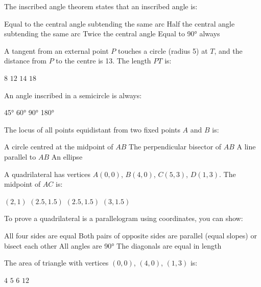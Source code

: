 \documentclass[addpoints]{exam}
\begin{document}
\begin{questions}
\question[1] The inscribed angle theorem states that an inscribed angle is:
\begin{choices}
    \choice Equal to the central angle subtending the same arc
    \correctchoice Half the central angle subtending the same arc
    \choice Twice the central angle
    \choice Equal to \ang{90} always
\end{choices}

\question[1] A tangent from an external point $P$ touches a circle (radius 5) at $T$,
and the distance from $P$ to the centre is 13. The length $PT$ is:
\begin{choices}
    \choice $8$
    \correctchoice $12$
    \choice $14$
    \choice $18$
\end{choices}

\question[1] An angle inscribed in a semicircle is always:
\begin{choices}
    \choice \ang{45}
    \choice \ang{60}
    \correctchoice \ang{90}
    \choice \ang{180}
\end{choices}

\question[1] The locus of all points equidistant from two fixed points $A$ and $B$ is:
\begin{choices}
    \choice A circle centred at the midpoint of $AB$
    \correctchoice The perpendicular bisector of $AB$
    \choice A line parallel to $AB$
    \choice An ellipse
\end{choices}

\question[1] A quadrilateral has vertices $A(0,0)$, $B(4,0)$, $C(5,3)$, $D(1,3)$.
The midpoint of $AC$ is:
\begin{choices}
    \choice $(2, 1)$
    \choice $(2.5, 1.5)$
    \correctchoice $(2.5, 1.5)$
    \choice $(3, 1.5)$
\end{choices}

\question[1] To prove a quadrilateral is a parallelogram using coordinates, you can show:
\begin{choices}
    \choice All four sides are equal
    \correctchoice Both pairs of opposite sides are parallel (equal slopes) or bisect each other
    \choice All angles are \ang{90}
    \choice The diagonals are equal in length
\end{choices}

\question[1] The area of triangle with vertices $(0,0)$, $(4,0)$, $(1,3)$ is:
\begin{choices}
    \choice $4$
    \choice $5$
    \correctchoice $6$
    \choice $12$
\end{choices}


\end{questions}
\end{document}
